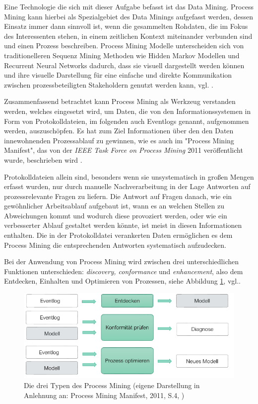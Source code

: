 Eine Technologie die sich mit dieser Aufgabe befasst ist das Data Mining. Process Mining kann hierbei als Spezialgebiet des Data Minings aufgefasst werden, dessen Einsatz immer dann sinnvoll ist, wenn die gesammelten Rohdaten, die im Fokus des Interessenten stehen, in einem zeitlichen Kontext miteinander verbunden sind und einen Prozess beschreiben.
Process Mining Modelle unterscheiden sich von traditionelleren Sequenz Mining Methoden wie Hidden Markov Modellen \cite{hmm} und Recurrent Neural Networks \cite{rnn} dadurch, dass sie visuell dargestellt werden können und ihre visuelle Darstellung für eine einfache und direkte Kommunikation zwischen prozessbeteiligten Stakeholdern genutzt werden kann, vgl. \cite{localMining}.

Zusammenfassend betrachtet kann Process Mining als Werkzeug verstanden werden, welches eingesetzt wird, um Daten, die von den Informationssystemen in Form von Protokolldateien, im folgenden auch Eventlogs genannt, aufgenommen werden, auszuschöpfen. Es hat zum Ziel  Informationen über den den Daten innewohnenden Prozessablauf zu gewinnen, wie es auch im "Process Mining Manifest", das von der \textit{IEEE Task Force on Process Mining} 2011 veröffentlicht wurde, beschrieben wird \cite{PMManifesto}. 

Protokolldateien allein sind, besonders wenn sie unsystematisch in großen Mengen erfasst wurden, nur durch manuelle Nachverarbeitung in der Lage Antworten auf prozessrelevante Fragen zu liefern. Die Antwort auf Fragen danach, wie ein gewöhnlicher Arbeitsablauf aufgebaut ist, wann es an welchen Stellen zu Abweichungen kommt und wodurch diese provoziert werden, oder wie ein verbesserter Ablauf gestaltet werden könnte, ist meist in diesen Informationen enthalten. Die in der Protokolldatei verankerten Daten ermöglichen es dem Process Mining die entsprechenden Antworten systematisch aufzudecken. 

Bei der Anwendung von Process Mining wird zwischen drei unterschiedlichen Funktionen unterschieden:  \textit{discovery, conformance} und \textit{enhancement}, also dem Entdecken, Einhalten und Optimieren von Prozessen, siehe Abbildung \ref{fig:pm_functions}, vgl.\cite{PMManifesto}.
\vspace{10mm}

\begin{figure}[!ht]
    \centering
    \includegraphics[scale=0.8]{figures/Appbildungen/PM_functions.PNG}
    \caption{Die drei Typen des Process Mining (eigene Darstellung in Anlehnung an: Process Mining Manifest, 2011, S.4, \cite{PMManifesto})}
    \label{fig:pm_functions}
\end{figure}

